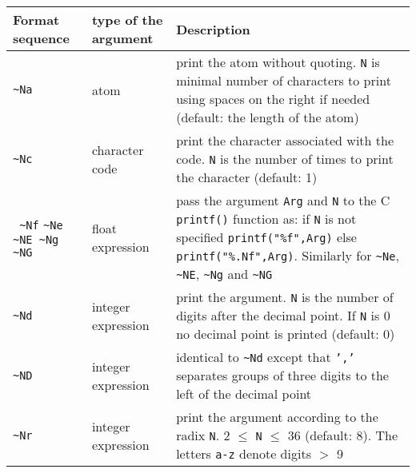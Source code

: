 \begin{tabular}{|C{1.4cm}|C{2.8cm}|p{10.45cm}|}
\hline

Format sequence  & type of the argument & Description \\

\hline\hline

\texttt{\~{}Na} & atom & print the atom without quoting. \texttt{N} is minimal number of characters to print using spaces on the right if needed (default: the length of the atom) \\

\hline

\texttt{\~{}Nc} & character code & print the character associated with the
code. \texttt{N} is the number of times to print the character (default: 1)\\

\hline

\texttt{ \~{}Nf}
\linebreak
\texttt{\~{}Ne \~{}NE \~{}Ng \~{}NG}
               &  float expression & pass the argument \texttt{Arg} and
                                     \texttt{N} to the C \texttt{printf()}
                                     function as:
\linebreak
                               if \texttt{N} is not specified
                               \texttt{printf("\%f",Arg)} else
                               \texttt{printf("\%.Nf",Arg)}.
\linebreak
Similarly for \texttt{\~{}Ne}, \texttt{\~{}NE}, \texttt{\~{}Ng} and \texttt{\~{}NG} \\

\hline

\texttt{\~{}Nd} & integer expression & print the argument. \texttt{N} is the
number of digits after the decimal point. If \texttt{N} is 0 no
decimal point is printed (default: 0)\\

\hline

\texttt{\~{}ND} & integer expression & identical to \texttt{\~{}Nd} except
that \texttt{','} separates groups of three digits to the left of the
decimal point \\

\hline

\texttt{\~{}Nr} & integer expression & print the argument according to the
radix \texttt{N}. 2 $\leq$ \texttt{N} $\leq$ 36 (default: 8). The letters
\texttt{a-z} denote digits $>$ 9 \\

\hline


\end{tabular}
